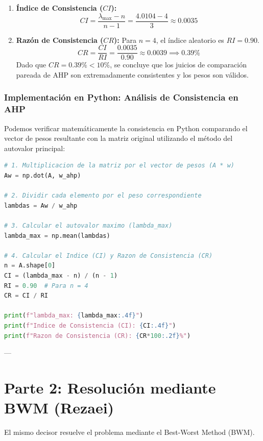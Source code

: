 \documentclass[11pt, letterpaper]{article}
\begin{document}
\begin{enumerate}
    \item \textbf{Índice de Consistencia ($CI$):}
    \begin{equation}
        CI = \frac{\lambda_{\max} - n}{n-1} = \frac{4.0104 - 4}{3} \approx 0.0035
    \end{equation}
    
    \item \textbf{Razón de Consistencia ($CR$):}
    Para $n=4$, el índice aleatorio es $RI = 0.90$.
    \begin{equation}
        CR = \frac{CI}{RI} = \frac{0.0035}{0.90} \approx 0.0039 \implies \mathbf{0.39\%}
    \end{equation}
    Dado que $CR = 0.39\% < 10\%$, se concluye que los juicios de comparación pareada de AHP son extremadamente consistentes y los pesos son válidos.
\end{enumerate}

\subsubsection{Implementación en Python: Análisis de Consistencia en AHP}
Podemos verificar matemáticamente la consistencia en Python comparando el vector de pesos resultante con la matriz original utilizando el método del autovalor principal:
\begin{lstlisting}[language=Python]
# 1. Multiplicacion de la matriz por el vector de pesos (A * w)
Aw = np.dot(A, w_ahp)

# 2. Dividir cada elemento por el peso correspondiente
lambdas = Aw / w_ahp

# 3. Calcular el autovalor maximo (lambda_max)
lambda_max = np.mean(lambdas)

# 4. Calcular el Indice (CI) y Razon de Consistencia (CR)
n = A.shape[0]
CI = (lambda_max - n) / (n - 1)
RI = 0.90  # Para n = 4
CR = CI / RI

print(f"lambda_max: {lambda_max:.4f}")
print(f"Indice de Consistencia (CI): {CI:.4f}")
print(f"Razon de Consistencia (CR): {CR*100:.2f}%")
\end{lstlisting}

---

\section{Parte 2: Resolución mediante BWM (Rezaei)}

El mismo decisor resuelve el problema mediante el Best-Worst Method (BWM). 
\end{document}
